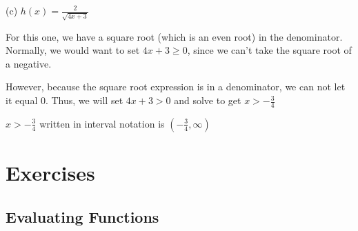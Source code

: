 \begin{solution}
(c) $h(x) = \frac{2}{\sqrt{4x+3}}$	\newline 

For this one, we have a square root (which is an even root) in the denominator. Normally, we would want to set $4x + 3 \geq 0$, since we can't take the square root of a negative. \newline 

However, because the square root expression is in a denominator, we can not let it equal 0. Thus, we will set $4x + 3 > 0$ and solve to get $x > -\frac{3}{4}$ \newline 

$x > -\frac{3}{4}$ written in interval notation is $\left(-\frac{3}{4}, \infty\right)$
\end{solution}

\section{Exercises}

\subsection*{Evaluating Functions}

